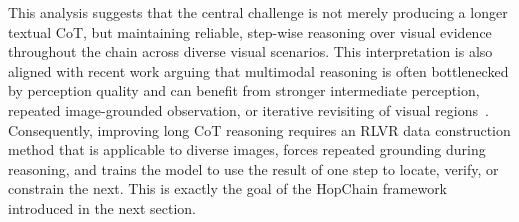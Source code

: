 This analysis suggests that the central challenge is not merely producing a longer textual CoT, but maintaining reliable, step-wise reasoning over visual evidence throughout the chain across diverse visual scenarios.
This interpretation is also aligned with recent work arguing that multimodal reasoning is often bottlenecked by perception quality and can benefit from stronger intermediate perception, repeated image-grounded observation, or iterative revisiting of visual regions~.
Consequently, improving long CoT reasoning requires an RLVR data construction method that is applicable to diverse images, forces repeated grounding during reasoning, and trains the model to use the result of one step to locate, verify, or constrain the next.
This is exactly the goal of the HopChain framework introduced in the next section.
